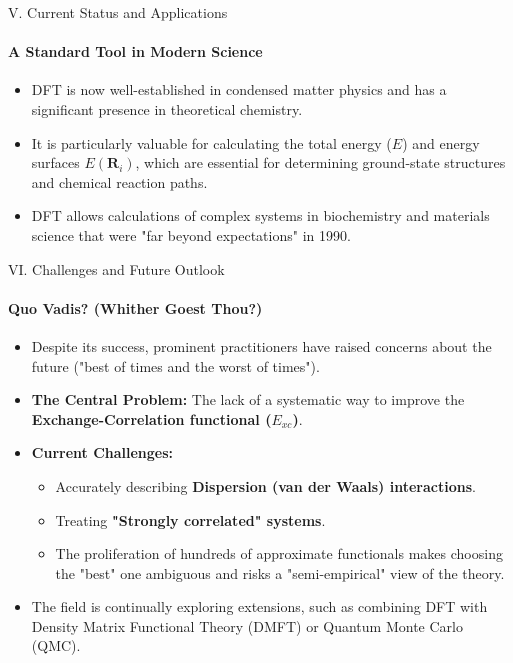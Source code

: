 \begin{frame}{\large V. Current Status and Applications}
    \framesubtitle{A Standard Tool in Modern Science}
    \begin{itemize}
        \item DFT is now well-established in condensed matter physics and has a significant presence in theoretical chemistry.
        \item It is particularly valuable for calculating the total energy ($E$) and energy surfaces $E(\mathbf{R}_i)$, which are essential for determining ground-state structures and chemical reaction paths.
        \item DFT allows calculations of complex systems in biochemistry and materials science that were "far beyond expectations" in 1990.
    \end{itemize}
\end{frame}

\begin{frame}{\large VI. Challenges and Future Outlook}
    \framesubtitle{Quo Vadis? (Whither Goest Thou?)}
    \begin{itemize}
        \item Despite its success, prominent practitioners have raised concerns about the future ("best of times and the worst of times").
        \item \textbf{The Central Problem:} The lack of a systematic way to improve the \textbf{Exchange-Correlation functional ($E_{xc}$)}.
        \item \textbf{Current Challenges:}
        \begin{itemize}
            \item Accurately describing \textbf{Dispersion (van der Waals) interactions}.
            \item Treating \textbf{"Strongly correlated" systems}.
            \item The proliferation of hundreds of approximate functionals makes choosing the "best" one ambiguous and risks a "semi-empirical" view of the theory.
        \end{itemize}
        \item The field is continually exploring extensions, such as combining DFT with Density Matrix Functional Theory (DMFT) or Quantum Monte Carlo (QMC).
    \end{itemize}
\end{frame}

